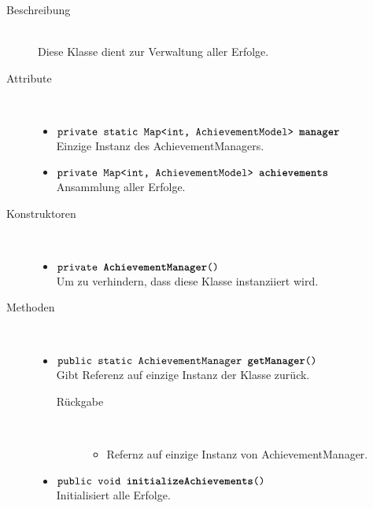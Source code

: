 \begin{description}
\item[Beschreibung] \hfill \\ Diese Klasse dient zur Verwaltung aller Erfolge.
\item[Attribute] \hfill \\
	\vspace{-.8cm}
	\begin{itemize}
		\item $\texttt{private static Map<int, AchievementModel> \textbf{manager}}$ \\ Einzige Instanz des AchievementManagers.
		\item $\texttt{private Map<int, AchievementModel> \textbf{achievements}}$ \\ Ansammlung aller Erfolge.
			\end{itemize}	
\item[Konstruktoren] \hfill \\
	\vspace{-.8cm}
	\begin{itemize}
		\item $\texttt{private \textbf{AchievementManager}()}$ \\ Um zu verhindern, dass diese Klasse instanziiert wird.
	\end{itemize}
	
\item[Methoden] \hfill \\
	\vspace{-.8cm}
	\begin{itemize}
		
		\item $\texttt{public static AchievementManager \textbf{getManager}()}$ \\ Gibt Referenz auf einzige Instanz der Klasse zurück.
		\begin{description}
			\item[Rückgabe] \hfill \\
			\vspace{-.8cm}
			\begin{itemize}
				\item Refernz auf einzige Instanz von AchievementManager.
			\end{itemize}
		\end{description}
		
		
		\item $\texttt{public void \textbf{initializeAchievements}()}$ \\ Initialisiert alle Erfolge.
	

\end{itemize}
\end{description}
